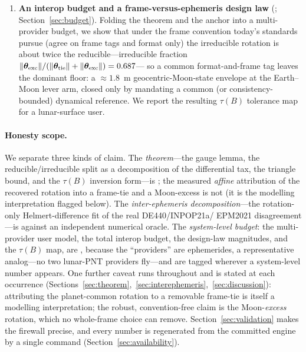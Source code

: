 \begin{enumerate}
  \item \textbf{An interop budget and a frame-versus-ephemeris design law}
  (\Modelled{}; Section~\ref{sec:budget}). Folding the theorem and the anchor into a
  multi-provider budget, we show that under the frame convention today's standards
  pursue (agree on frame tags and format only) the irreducible rotation is about
  twice the reducible---irreducible fraction
  $\|\bm{\theta}_{\mathrm{exc}}\|/(\|\bm{\theta}_{\mathrm{tie}}\|+\|\bm{\theta}_{\mathrm{exc}}\|)=0.687$---%
  so a common format-and-frame tag leaves the dominant floor: a $\approx\!1.8$~m
  geocentric-Moon-state envelope at the Earth--Moon lever arm, closed only by
  mandating a common (or consistency-bounded) dynamical reference. We report the
  resulting $\tau(B)$ tolerance map for a lunar-surface user.
\end{enumerate}

\paragraph{Honesty scope.}
We separate three kinds of claim. The \emph{theorem}---the gauge lemma, the
reducible/irreducible split as a decomposition of the differential tax, the triangle
bound, and the $\tau(B)$ inversion form---is \Proven{}; the measured \emph{affine}
attribution of the recovered rotation into a frame-tie and a Moon-excess is not (it is
the modelling interpretation flagged below). The \emph{inter-ephemeris
decomposition}---the rotation-only Helmert-difference fit of the real DE440/INPOP21a/%
EPM2021 disagreement---is \Validated{} against an independent numerical oracle. The
\emph{system-level budget}: the multi-provider user model, the total interop budget,
the design-law magnitudes, and the $\tau(B)$ map, are \Modelled{}, because the
``providers'' are ephemerides, a representative analog---no two lunar-PNT providers
fly---and are tagged \modtag{} wherever a system-level number appears. One further
caveat runs throughout and is stated at each occurrence
(Sections~\ref{sec:theorem},~\ref{sec:interephemeris},~\ref{sec:discussion}):
attributing the planet-common rotation to a removable frame-tie is itself a modelling
interpretation; the robust, convention-free claim is the Moon-\emph{excess} rotation,
which no whole-frame choice can remove. Section~\ref{sec:validation} makes the
firewall precise, and every number is regenerated from the committed engine by a
single command (Section~\ref{sec:availability}).
